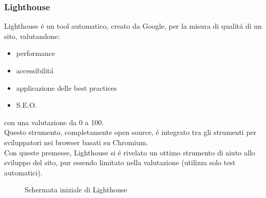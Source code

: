 \documentclass[]{article}
\begin{document}
\subsubsection*{Lighthouse}
Lighthouse é un tool automatico, creato da Google, per la misura di qualitá di un sito, valutandone:
\begin{itemize}
	\item performance
	\item accessibilitá
	\item applicazione delle best practices
	\item S.E.O.
\end{itemize}
con una valutazione da 0 a 100.\\
Questo strumento, completamente open source, é integrato tra gli strumenti per sviluppatori nei browser basati su Chromium.\\
Con queste premesse, Lighthouse si é rivelato un ottimo strumento di aiuto allo sviluppo del sito, pur essendo limitato nella valutazione (utilizza solo test automatici).

\begin{figure}[H]
	\centering
	\caption{Schermata iniziale di Lighthouse}
\end{figure}
\end{document}
